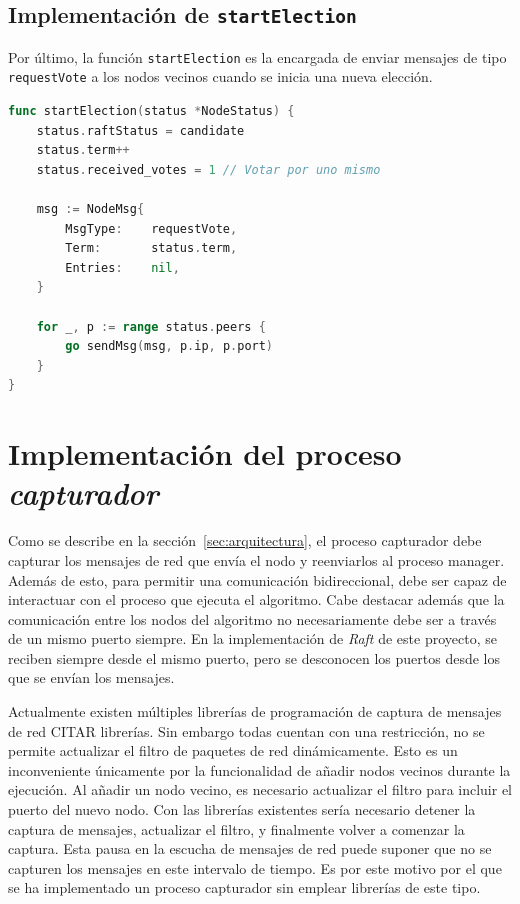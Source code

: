 \subsection{Implementación de \texttt{startElection}}

Por último, la función \texttt{startElection} es la encargada de enviar mensajes de tipo \texttt{requestVote} a los nodos vecinos cuando se inicia una nueva elección. 

\begin{lstlisting}[language=go]
func startElection(status *NodeStatus) {
	status.raftStatus = candidate
	status.term++
	status.received_votes = 1 // Votar por uno mismo

	msg := NodeMsg{
		MsgType:    requestVote,
		Term:       status.term,
		Entries:    nil,
	}

	for _, p := range status.peers {
		go sendMsg(msg, p.ip, p.port)
	}
}
\end{lstlisting}

\section{Implementación del proceso \textit{capturador}}

Como se describe en la sección~\ref{sec:arquitectura}, el proceso capturador debe capturar los mensajes de red que envía el nodo y reenviarlos al proceso manager. Además de esto, para permitir una comunicación bidireccional, debe ser capaz de interactuar con el proceso que ejecuta el algoritmo. Cabe destacar además que la comunicación entre los nodos del algoritmo no necesariamente debe ser a través de un mismo puerto siempre. En la implementación de \textit{Raft} de este proyecto, se reciben siempre desde el mismo puerto, pero se desconocen los puertos desde los que se envían los mensajes.

Actualmente existen múltiples librerías de programación de captura de mensajes de red CITAR librerías. Sin embargo todas cuentan con una restricción, no se permite actualizar el filtro de paquetes de red dinámicamente. Esto es un inconveniente únicamente por la funcionalidad de añadir nodos vecinos durante la ejecución. Al añadir un nodo vecino, es necesario actualizar el filtro para incluir el puerto del nuevo nodo. Con las librerías existentes sería necesario detener la captura de mensajes, actualizar el filtro, y finalmente volver a comenzar la captura. Esta pausa en la escucha de mensajes de red puede suponer que no se capturen los mensajes en este intervalo de tiempo. Es por este motivo por el que se ha implementado un proceso capturador sin emplear librerías de este tipo.

